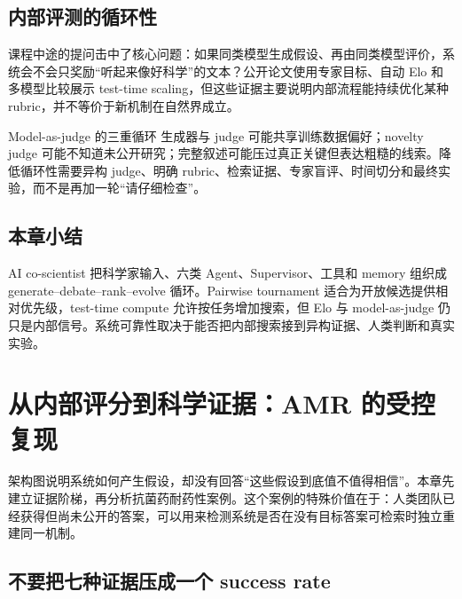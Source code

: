 \documentclass[a4paper]{article}
\begin{document}

\subsection{内部评测的循环性}

课程中途的提问击中了核心问题：如果同类模型生成假设、再由同类模型评价，系统会不会只奖励“听起来像好科学”的文本？公开论文使用专家目标、自动 Elo 和多模型比较展示 test-time scaling，但这些证据主要说明内部流程能持续优化某种 rubric，并不等价于新机制在自然界成立。

\begin{warningbox}{Model-as-judge 的三重循环}
生成器与 judge 可能共享训练数据偏好；novelty judge 可能不知道未公开研究；完整叙述可能压过真正关键但表达粗糙的线索。降低循环性需要异构 judge、明确 rubric、检索证据、专家盲评、时间切分和最终实验，而不是再加一轮“请仔细检查”。
\end{warningbox}


\subsection{本章小结}

AI co-scientist 把科学家输入、六类 Agent、Supervisor、工具和 memory 组织成 generate--debate--rank--evolve 循环。Pairwise tournament 适合为开放候选提供相对优先级，test-time compute 允许按任务增加搜索，但 Elo 与 model-as-judge 仍只是内部信号。系统可靠性取决于能否把内部搜索接到异构证据、人类判断和真实实验。

\section{从内部评分到科学证据：AMR 的受控复现}

架构图说明系统如何产生假设，却没有回答“这些假设到底值不值得相信”。本章先建立证据阶梯，再分析抗菌药耐药性案例。这个案例的特殊价值在于：人类团队已经获得但尚未公开的答案，可以用来检测系统是否在没有目标答案可检索时独立重建同一机制。

\subsection{不要把七种证据压成一个 success rate}
\end{document}
